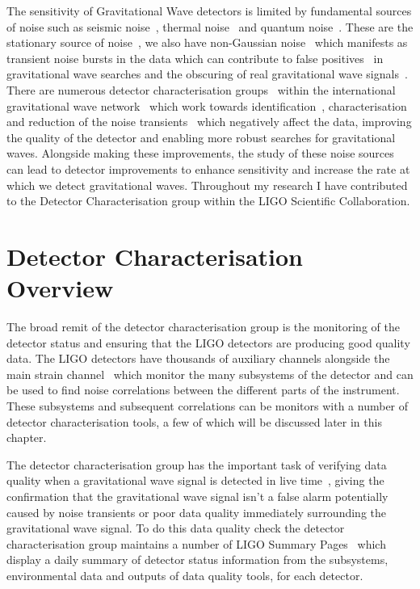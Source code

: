 The sensitivity of Gravitational Wave detectors is limited by fundamental sources of noise such as seismic noise~\cite{}, thermal noise~\cite{} and quantum noise~\cite{}. These are the stationary source of noise~\cite{}, we also have non-Gaussian noise~\cite{} which manifests as transient noise bursts in the data which can contribute to false positives~\cite{} in gravitational wave searches and the obscuring of real gravitational wave signals~\cite{}. There are numerous detector characterisation groups~\cite{} within the international gravitational wave network~\cite{} which work towards identification~\cite{}, characterisation~\cite{} and reduction of the noise transients~\cite{} which negatively affect the data, improving the quality of the detector and enabling more robust searches for gravitational waves. Alongside making these improvements, the study of these noise sources can lead to detector improvements to enhance sensitivity and increase the rate at which we detect gravitational waves. Throughout my research I have contributed to the Detector Characterisation group within the LIGO Scientific Collaboration.

\section{Detector Characterisation Overview}

The broad remit of the detector characterisation group is the monitoring of the detector status and ensuring that the LIGO detectors are producing good quality data. The LIGO detectors have thousands of auxiliary channels alongside the main strain channel~\cite{} which monitor the many subsystems of the detector and can be used to find noise correlations between the different parts of the instrument. These subsystems and subsequent correlations can be monitors with a number of detector characterisation tools, a few of which will be discussed later in this chapter.

The detector characterisation group has the important task of verifying data quality when a gravitational wave signal is detected in live time~\cite{}, giving the confirmation that the gravitational wave signal isn't a false alarm potentially caused by noise transients or poor data quality immediately surrounding the gravitational wave signal. To do this data quality check the detector characterisation group maintains a number of LIGO Summary Pages~\cite{} which display a daily summary of detector status information from the subsystems, environmental data and outputs of data quality tools, for each detector.


